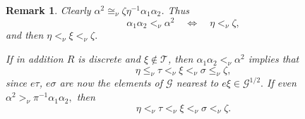 \documentclass [12pt,a4paper,reqno]{amsart}
\newtheorem{remark}[thm]{Remark}
\begin{document}
\begin{remark}\label{rmk:II.7.2} Clearly ${\alpha}^2 {\cong_\nu} {\zeta} \eta^{-1} {\alpha}_1 {\alpha}_2$. Thus
\begin{equation}\label{eq:II.7.4}
{\alpha}_1 {\alpha}_2 {<_\nu} {\alpha}^2 {\quad {\iff} \quad } \eta {<_\nu} {\zeta},
\end{equation}
and then $\eta {<_\nu} {\xi} {<_\nu} {\zeta}.$

If in addition $R$ is discrete and ${\xi} \notin {\mathcal T}$, then ${\alpha}_1 {\alpha}_2 {<_\nu} {\alpha}^2$ implies that
\begin{equation}\label{eq:II.7.5}
\eta {\leq_\nu} \tau {<_\nu} {\xi} {<_\nu} {\sigma} {\leq_\nu} {\zeta},
\end{equation}
since $e\tau$, $e {\sigma}$ are now  the elements of ${\mathcal G}$ nearest to $e {\xi} \in {\mathcal G}^{1/2}.$ If even ${\alpha}^2 {>_\nu} \pi ^{-1} {\alpha}_1 {\alpha}_2,$ then
\begin{equation}\label{eq:II.7.6}
\eta {<_\nu} \tau {<_\nu} {\xi} {<_\nu} {\sigma} {<_\nu} {\zeta}.
\end{equation}

\end{remark}
\end{document}
